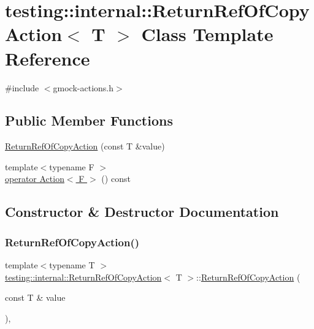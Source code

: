 \hypertarget{classtesting_1_1internal_1_1_return_ref_of_copy_action}{}\section{testing\+:\+:internal\+:\+:Return\+Ref\+Of\+Copy\+Action$<$ T $>$ Class Template Reference}
\label{classtesting_1_1internal_1_1_return_ref_of_copy_action}


{\ttfamily \#include $<$gmock-\/actions.\+h$>$}

\subsection*{Public Member Functions}
\begin{DoxyCompactItemize}
\item 
\hyperlink{classtesting_1_1internal_1_1_return_ref_of_copy_action_a073c18a8b50423b08f6603e860622839}{Return\+Ref\+Of\+Copy\+Action} (const T \&value)
\item 
{\footnotesize template$<$typename F $>$ }\\\hyperlink{classtesting_1_1internal_1_1_return_ref_of_copy_action_a8b4829fbb46c3ca6468f3eb5c5b42493}{operator Action$<$ F $>$} () const
\end{DoxyCompactItemize}


\subsection{Constructor \& Destructor Documentation}
\mbox{\label{classtesting_1_1internal_1_1_return_ref_of_copy_action_a073c18a8b50423b08f6603e860622839}} 
\subsubsection{\texorpdfstring{Return\+Ref\+Of\+Copy\+Action()}{ReturnRefOfCopyAction()}}
{\footnotesize\ttfamily template$<$typename T $>$ \\
\hyperlink{classtesting_1_1internal_1_1_return_ref_of_copy_action}{testing\+::internal\+::\+Return\+Ref\+Of\+Copy\+Action}$<$ T $>$\+::\hyperlink{classtesting_1_1internal_1_1_return_ref_of_copy_action}{Return\+Ref\+Of\+Copy\+Action} (\begin{DoxyParamCaption}\item[{const T \&}]{value }\end{DoxyParamCaption})\hspace{0.3cm}{\ttfamily [inline]}, {\ttfamily [explicit]}}



